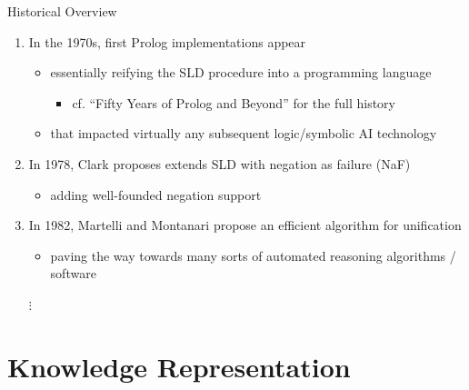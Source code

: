 \documentclass[presentation]{beamer}\mode<presentation>{\usetheme{AMSBolognaFC}}
\begin{document}
\begin{frame}[allowframebreaks]{Historical Overview}
\begin{enumerate}
        \bigskip

        \item In the 1970s, first Prolog implementations appear
        \begin{itemize}
            \item essentially reifying the SLD procedure into a programming language
            \begin{itemize}
                \item cf. ``Fifty Years of Prolog and Beyond'' for the full history
            \end{itemize}
            \item that impacted virtually any subsequent logic/symbolic AI technology
        \end{itemize}

        \framebreak

        \item In 1978, Clark proposes extends SLD with \alert{negation as failure} (NaF)
        \begin{itemize}
            \item adding well-founded negation support
        \end{itemize}

        \bigskip

        \item In 1982, Martelli and Montanari propose an efficient algorithm for unification
        \begin{itemize}
            \item paving the way towards many sorts of automated reasoning algorithms / software
        \end{itemize}

        \bigskip

        \item[$\vdots$]

    \end{enumerate}
\end{frame}

\section{Knowledge Representation}
\end{document}
